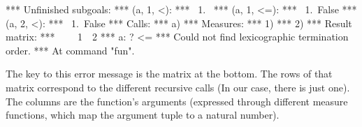 \begin{isabellebody}
\begin{isamarkuptext}
\begin{isabelle}
*** Unfinished subgoals:\newline
*** (a, 1, <):\newline
*** \ 1.~\newline
*** (a, 1, <=):\newline
*** \ 1.~False\newline
*** (a, 2, <):\newline
*** \ 1.~False\newline
*** Calls:\newline
*** a) \newline
*** Measures:\newline
*** 1) \newline
*** 2) \newline
*** Result matrix:\newline
*** \ \ \ \ 1\ \ 2  \newline
*** a:  ?   <= \newline
*** Could not find lexicographic termination order.\newline
*** At command "fun".\newline
\end{isabelle}%
\end{isamarkuptext}%
\isamarkuptrue%
%
\begin{isamarkuptext}%
The key to this error message is the matrix at the bottom. The rows
  of that matrix correspond to the different recursive calls (In our
  case, there is just one). The columns are the function's arguments 
  (expressed through different measure functions, which map the
  argument tuple to a natural number). 


\end{isamarkuptext}
\end{isabellebody}
